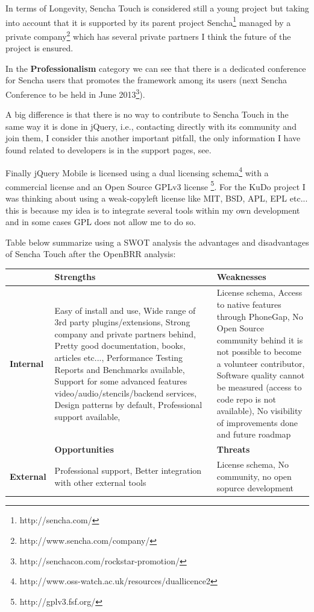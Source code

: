 \documentclass[a4paper,12pt]{book}
\begin{document}
In terms of Longevity, Sencha Touch is considered still a young project but taking into account that it is supported by its parent project Sencha\footnote{http://sencha.com/}  managed by a private company\footnote{http://www.sencha.com/company/}  which has several private partners I think the future of the project is ensured.

In the \textbf{Professionalism} category we can see that there is a dedicated conference for Sencha users\cite{sencha Conferences} that promotes the framework among its users  (next Sencha Conference to be held in June 2013\footnote{http://senchacon.com/rockstar-promotion/}).

A big difference is that there is no way to contribute to Sencha Touch in the same way it is done in jQuery, i.e., contacting directly with its community and join them, I consider this another important pitfall, the only information I have found related to developers is in the support pages, see\cite{sencha devs}.  

Finally jQuery Mobile is licensed using a dual licensing schema\footnote{http://www.oss-watch.ac.uk/resources/duallicence2}  with a commercial license and an Open Source GPLv3 license \footnote{http://gplv3.fsf.org/}. For the KuDo project I was thinking about using a weak-copyleft license like MIT, BSD, APL, EPL etc... this is because my idea is to integrate several tools within my own development and in some cases GPL does not allow me to do so. 

Table below summarize using a SWOT analysis the advantages and disadvantages of Sencha Touch after the OpenBRR analysis:

\begin{center}
    \begin{tabular}{ | p{1.7cm} | p{6cm} | p{6cm} |}
    \hline
    & \textbf{Strengths} & \textbf{Weaknesses} \\ \hline
    \textbf{Internal} & 
    Easy of install and use, %
    Wide range of 3rd party plugins/extensions,
    Strong company and private partners behind,
    Pretty good documentation, books, articles etc...,
    Performance Testing Reports and Benchmarks available,
    Support for some advanced features video/audio/stencils/backend services,
    Design patterns by default,
    Professional support available,
    & License schema, %
    Access to native features through PhoneGap, 
    No Open Source community behind it is not possible to become a volunteer contributor,
    Software quality cannot be measured (access to code repo is not available),
    No visibility of improvements done and future roadmap\\ \hline
    & \textbf{Opportunities} & \textbf{Threats} \\ \hline
    \textbf{External}  
    & Professional support, %
    Better integration with other external tools
    & License schema, %
    No community, no open sopurce development\\ \hline
    \end{tabular}
\end{center}
\end{document}
